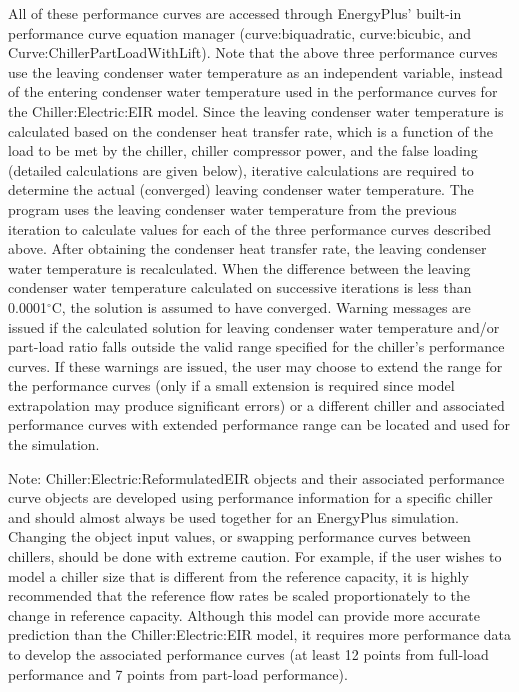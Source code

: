 All of these performance curves are accessed through EnergyPlus' built-in performance curve equation manager (curve:biquadratic, curve:bicubic, and Curve:ChillerPartLoadWithLift). Note that the above three performance curves use the leaving condenser water temperature as an independent variable, instead of the entering condenser water temperature used in the performance curves for the Chiller:Electric:EIR model. Since the leaving condenser water temperature is calculated based on the condenser heat transfer rate, which is a function of the load to be met by the chiller, chiller compressor power, and the false loading (detailed calculations are given below), iterative calculations are required to determine the actual (converged) leaving condenser water temperature. The program uses the leaving condenser water temperature from the previous iteration to calculate values for each of the three performance curves described above. After obtaining the condenser heat transfer rate, the leaving condenser water temperature is recalculated. When the difference between the leaving condenser water temperature calculated on successive iterations is less than 0.0001\(^{\circ}\)C, the solution is assumed to have converged. Warning messages are issued if the calculated solution for leaving condenser water temperature and/or part-load ratio falls outside the valid range specified for the chiller's performance curves. If these warnings are issued, the user may choose to extend the range for the performance curves (only if a small extension is required since model extrapolation may produce significant errors) or a different chiller and associated performance curves with extended performance range can be located and used for the simulation.

Note: Chiller:Electric:ReformulatedEIR objects and their associated performance curve objects are developed using performance information for a specific chiller and should almost always be used together for an EnergyPlus simulation. Changing the object input values, or swapping performance curves between chillers, should be done with extreme caution. For example, if the user wishes to model a chiller size that is different from the reference capacity, it is highly recommended that the reference flow rates be scaled proportionately to the change in reference capacity. Although this model can provide more accurate prediction than the Chiller:Electric:EIR model, it requires more performance data to develop the associated performance curves (at least 12 points from full-load performance and 7 points from part-load performance).

